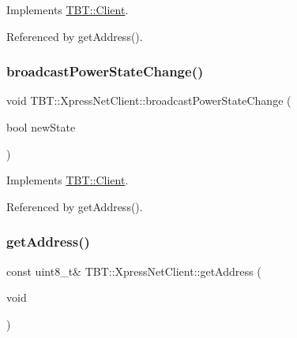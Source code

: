 Implements \hyperlink{classTBT_1_1Client_aeb3b63a37edc6b95872df54a57c27a71_aeb3b63a37edc6b95872df54a57c27a71}{T\+B\+T\+::\+Client}.



Referenced by get\+Address().

\mbox{\label{classTBT_1_1XpressNetClient_a6f104050aad16ef336a6b83d2c60550a_a6f104050aad16ef336a6b83d2c60550a}} 
\subsubsection{\texorpdfstring{broadcast\+Power\+State\+Change()}{broadcastPowerStateChange()}}
{\footnotesize\ttfamily void T\+B\+T\+::\+Xpress\+Net\+Client\+::broadcast\+Power\+State\+Change (\begin{DoxyParamCaption}\item[{bool}]{new\+State }\end{DoxyParamCaption})\hspace{0.3cm}{\ttfamily [virtual]}}



Implements \hyperlink{classTBT_1_1Client_ad64588b494ec98154ea261ed4f3b3643_ad64588b494ec98154ea261ed4f3b3643}{T\+B\+T\+::\+Client}.



Referenced by get\+Address().

\mbox{\label{classTBT_1_1XpressNetClient_aae838c0fdb74c9c7220056e3fa011390_aae838c0fdb74c9c7220056e3fa011390}} 
\subsubsection{\texorpdfstring{get\+Address()}{getAddress()}}
{\footnotesize\ttfamily const uint8\+\_\+t\& T\+B\+T\+::\+Xpress\+Net\+Client\+::get\+Address (\begin{DoxyParamCaption}\item[{void}]{ }\end{DoxyParamCaption})\hspace{0.3cm}{\ttfamily [inline]}}



